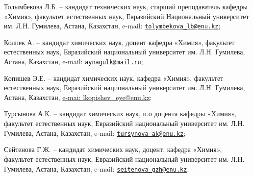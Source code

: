 \begin{authorinfo}
Толымбекова Л.Б. -- кандидат технических наук, старший преподаватель
кафедры «Химия», факультет естественных наук, Евразийский Национальный
университет им. Л.Н. Гумилева, Астана, Казахстан, e-mail:
\href{mailto:tolymbekova\_lb@enu.kz}{\nolinkurl{tolymbekova\_lb@enu.kz}};

Колпек А. -- кандидат химических наук, доцент кафедра «Химия», факультет
естественных наук, Евразийский национальный университет им. Л.Н.
Гумилева, Астана, Казахстан, e-mail:
\href{mailto:aynagulk@mail.ru}{\nolinkurl{aynagulk@mail.ru}};

Копишев Э.Е. -- кандидат химических наук, кафедра «Химия», факультет
естественных наук, Евразийский национальный университет им. Л.Н.
Гумилева, Астана, Казахстан,
\href{mailto:e-mai:\%20lkopishev\_eye@enu.kz}{e-mai:
lkopishev\_eye@enu.kz};

Турсынова А.К. -- кандидат химических наук, и.о доцента кафедры «Химия»,
факультет естественных наук, Евразийский национальный университет им.
Л.Н. Гумилева, Астана, Казахстан, e-mail:
\href{mailto:tursynova\_ak@enu.kz}{\nolinkurl{tursynova\_ak@enu.kz}};

Сейтенова Г.Ж. -- кандидат химических наук, доцент, кафедра «Химия»,
факультет естественных наук, Евразийский национальный университет им.
Л.Н. Гумилева, Астана, Казахстан, e-mail:
\href{mailto:seitenova\_gzh@enu.kz}{\nolinkurl{seitenova\_gzh@enu.kz}}.
\end{authorinfo}
